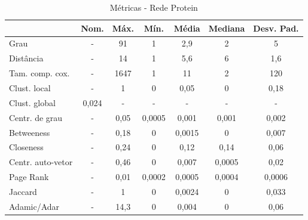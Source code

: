 \documentclass[12pt,a4paper]{article}
\begin{document}
	\begin{table}[H]
		\caption{Métricas - Rede Protein}
		\label{tab:protein}
		\centering
		\begin{tabular}{l|c|c|c|c|c|c}
			& \textbf{Nom.} & \textbf{Máx.} & \textbf{Mín.} & \textbf{Média} & \textbf{Mediana} & \textbf{Desv. Pad.} \\\hline
			Grau              & -                                 & 91            & 1             & 2,9              & 2                & 5                  \\\hline
			Distância         & -                                 & 14            & 1             & 5,6            & 6                & 1,6                \\\hline
			Tam. comp. cox.  & -                                   & 1647          & 1             & 11             & 2                & 120                \\\hline
			Clust. local      & -                                 & 1             & 0             & 0,05           & 0                & 0,18               \\\hline
			Clust. global     & 0,024                             & -             & -             & -              & -                & -                  \\\hline
			Centr. de grau    & -                                 & 0,05          & 0,0005        & 0,001          & 0,001            & 0,002              \\\hline
			Betweeness        & -                                 & 0,18          & 0             & 0,0015         & 0                & 0,007              \\\hline
			Closeness         & -                                 & 0,24          & 0             & 0,12           & 0,14             & 0,06               \\\hline
			Centr. auto-vetor & -                                 & 0,46          & 0          & 0,007          & 0,0005           & 0,02               \\\hline
			Page Rank         & -                                 & 0,01          & 0,0002        & 0,0005         & 0,0004           & 0,0006             \\\hline
			Jaccard           & -                                 & 1             & 0             & 0,0024         & 0                & 0,033              \\\hline
			Adamic/Adar       & -                                 & 14,3          & 0             & 0,004          & 0                & 0,06              
		\end{tabular}
	\end{table}
	
\end{document}
